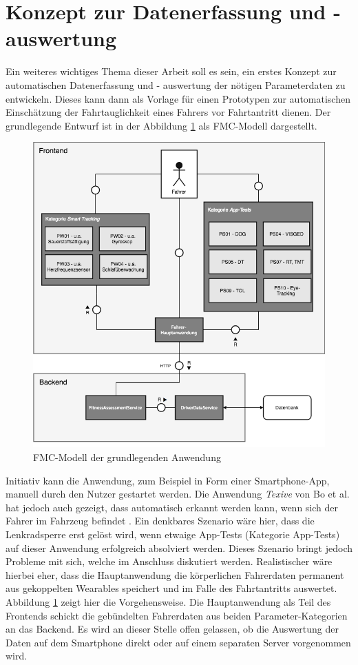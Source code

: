 \section{Konzept zur Datenerfassung und - auswertung}
\label{concept}
Ein weiteres wichtiges Thema dieser Arbeit soll es sein, ein erstes Konzept zur automatischen Datenerfassung und - auswertung der nötigen Parameterdaten zu entwickeln. Dieses kann dann als Vorlage für einen Prototypen zur automatischen Einschätzung der Fahrtauglichkeit eines Fahrers vor Fahrtantritt dienen. Der grundlegende Entwurf ist in der Abbildung \ref{fig:conceptfmc} als FMC-Modell dargestellt.

\begin{figure}
	\centering
	\includegraphics[width=\linewidth]{images/ConceptDriverAssessmentData}
	\caption[Caption for concept]{FMC-Modell der grundlegenden Anwendung}
	\label{fig:conceptfmc}
\end{figure}

Initiativ kann die Anwendung, zum Beispiel in Form einer Smartphone-App, manuell durch den Nutzer gestartet werden. Die Anwendung \textit{Texive} von Bo et al. hat jedoch auch gezeigt, dass automatisch erkannt werden kann, wenn sich der Fahrer im Fahrzeug befindet \cite{texive}. Ein denkbares Szenario wäre hier, dass die Lenkradsperre erst gelöst wird, wenn etwaige App-Tests (Kategorie App-Tests) auf dieser Anwendung erfolgreich absolviert werden. Dieses Szenario bringt jedoch Probleme mit sich, welche im Anschluss diskutiert werden. Realistischer wäre hierbei eher, dass die Hauptanwendung die körperlichen Fahrerdaten permanent aus gekoppelten  Wearables speichert und im Falle des Fahrtantritts auswertet. Abbildung \ref{fig:conceptfmc} zeigt hier die Vorgehensweise. Die Hauptanwendung als Teil des Frontends schickt die gebündelten Fahrerdaten aus beiden Parameter-Kategorien an das Backend. Es wird an dieser Stelle offen gelassen, ob die Auswertung der Daten auf dem Smartphone direkt oder auf einem separaten Server vorgenommen wird.

